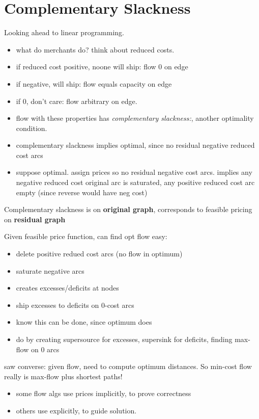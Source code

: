 \documentclass{article}
\begin{document}
\section*{Complementary Slackness}
Looking ahead to linear programming.
\begin{itemize}
\item what do merchants do?  think about reduced costs.
\item if reduced cost positive, noone will ship: flow 0 on edge
\item if negative, will ship: flow equals capacity on edge
\item if 0, don't care: flow arbitrary on edge.
\item flow with these properties has {\em complementary slackness:},
  another optimality condition.
\item complementary slackness implies optimal, since no residual
negative  reduced cost arcs
\item suppose optimal.  assign prices so no residual negative cost
  arcs.  implies any negative reduced cost original arc is saturated,
  any positive reduced cost arc empty (since reverse would have neg cost)
\end{itemize}

Complementary slackness is on {\bf original graph}, corresponds to
feasible pricing on {\bf residual graph}

Given feasible price function, can find opt flow easy:
\begin{itemize}
\item delete positive redued cost arcs (no flow in optimum)
\item saturate negative arcs
\item creates excesses/deficits at nodes
\item ship excesses to deficits on 0-cost arcs
\item know this can be done, since optimum does
\item do by creating supersource for excesses, supersink for deficits,
  finding max-flow on 0 arcs
\end{itemize}

saw converse: given flow, need to compute optimum distances.  So
  min-cost flow really is max-flow plus shortest paths!
\begin{itemize}
\item some flow algs use prices implicitly, to prove correctness
\item others use explicitly, to guide solution.
\end{itemize}
\end{document}
